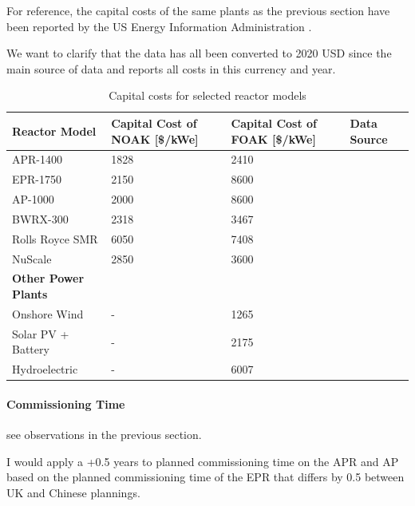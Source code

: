 For reference, the capital costs of the same plants as the previous section have been reported by the US Energy Information Administration \cite{EIA_Capital_Costs_AEO2024}.

We want to clarify that the data has all been converted to 2020 USD since the main source of data \cite{STEIGERWALD2023128204} and \cite{NEA2020} reports all costs in this currency and year. \\

\begin{table}[!hb]
    \centering
    \begin{tabularx}{\textwidth}{l X X X}
        \toprule
        \textbf{Reactor Model} & \textbf{Capital Cost of NOAK [\$/kWe]} & \textbf{Capital Cost of FOAK [\$/kWe]} & Data Source \\
        \midrule
        APR-1400         & 1828 & 2410 & \cite{STEIGERWALD2023128204, NEA2020} \\
        EPR-1750        & 2150 & 8600 & \cite{STEIGERWALD2023128204, NEA2020} \\
        AP-1000          & 2000 & 8600 & \cite{STEIGERWALD2023128204, NEA2020} \\
        BWRX-300        & 2318 & 3467 & \cite{ReutersEvents2018} \\
        Rolls Royce SMR & 6050 & 7408 & \cite{PowerTechnology2022} \\
        NuScale         & 2850 & 3600 & \cite{NuScale2020} \\
        \textbf{Other Power Plants} & & & \\
        Onshore Wind   & - & 1265 & \cite{EIA_Capital_Costs_AEO2024} \\
        Solar PV + Battery & - & 2175 & \cite{EIA_Capital_Costs_AEO2024} \\
        Hydroelectric  & - & 6007 & \cite{EIA_Capital_Costs_AEO2024} \\
        \bottomrule
    \end{tabularx}
    \caption{Capital costs for selected reactor models}
    \label{tab:capital-costs}
\end{table}

\paragraph{Commissioning Time} see observations in the previous section.

I would apply a +0.5 years to planned commissioning time on the APR and AP based on the planned commissioning time of the EPR that differs by 0.5 between UK and Chinese plannings. 

